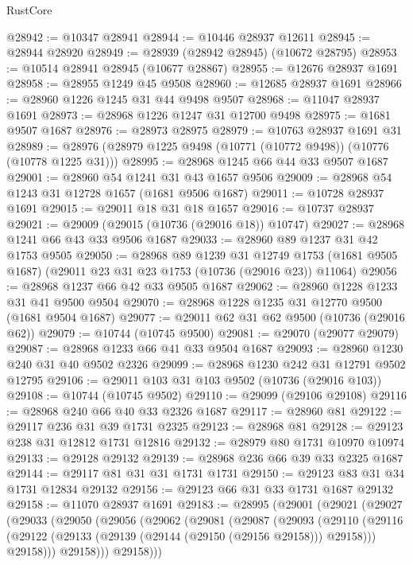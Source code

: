\begin{lexlean}{RustCore}
\begin{coremodule}
@28942 := @10347 @28941
@28944 := @10446 @28937 @12611
@28945 := @28944 @28920
@28949 := @28939 (@28942 @28945) (@10672 @28795)
@28953 := @10514 @28941 @28945 (@10677 @28867)
@28955 := @12676 @28937 @1691
@28958 := @28955 @1249 @45 @9508
@28960 := @12685 @28937 @1691
@28966 := @28960 @1226 @1245 @31 @44 @9498 @9507
@28968 := @11047 @28937 @1691
@28973 := @28968 @1226 @1247 @31 @12700 @9498
@28975 := @1681 @9507 @1687
@28976 := @28973 @28975
@28979 := @10763 @28937 @1691 @31
@28989 := @28976 (@28979 @1225 @9498 (@10771 (@10772 @9498)) (@10776 (@10778 @1225 @31)))
@28995 := @28968 @1245 @66 @44 @33 @9507 @1687
@29001 := @28960 @54 @1241 @31 @43 @1657 @9506
@29009 := @28968 @54 @1243 @31 @12728 @1657 (@1681 @9506 @1687)
@29011 := @10728 @28937 @1691
@29015 := @29011 @18 @31 @18 @1657
@29016 := @10737 @28937
@29021 := @29009 (@29015 (@10736 (@29016 @18)) @10747)
@29027 := @28968 @1241 @66 @43 @33 @9506 @1687
@29033 := @28960 @89 @1237 @31 @42 @1753 @9505
@29050 := @28968
    @89
    @1239
    @31
    @12749
    @1753
    (@1681 @9505 @1687)
    (@29011 @23 @31 @23 @1753 (@10736 (@29016 @23)) @11064)
@29056 := @28968 @1237 @66 @42 @33 @9505 @1687
@29062 := @28960 @1228 @1233 @31 @41 @9500 @9504
@29070 := @28968 @1228 @1235 @31 @12770 @9500 (@1681 @9504 @1687)
@29077 := @29011 @62 @31 @62 @9500 (@10736 (@29016 @62))
@29079 := @10744 (@10745 @9500)
@29081 := @29070 (@29077 @29079)
@29087 := @28968 @1233 @66 @41 @33 @9504 @1687
@29093 := @28960 @1230 @240 @31 @40 @9502 @2326
@29099 := @28968 @1230 @242 @31 @12791 @9502 @12795
@29106 := @29011 @103 @31 @103 @9502 (@10736 (@29016 @103))
@29108 := @10744 (@10745 @9502)
@29110 := @29099 (@29106 @29108)
@29116 := @28968 @240 @66 @40 @33 @2326 @1687
@29117 := @28960 @81
@29122 := @29117 @236 @31 @39 @1731 @2325
@29123 := @28968 @81
@29128 := @29123 @238 @31 @12812 @1731 @12816
@29132 := @28979 @80 @1731 @10970 @10974
@29133 := @29128 @29132
@29139 := @28968 @236 @66 @39 @33 @2325 @1687
@29144 := @29117 @81 @31 @31 @1731 @1731
@29150 := @29123 @83 @31 @34 @1731 @12834 @29132
@29156 := @29123 @66 @31 @33 @1731 @1687 @29132
@29158 := @11070 @28937 @1691
@29183 := @28995
    (@29001
      (@29021
        (@29027
          (@29033
            (@29050
              (@29056
                (@29062
                  (@29081
                    (@29087
                      (@29093
                        (@29110
                          (@29116
                            (@29122 (@29133 (@29139 (@29144 (@29150 (@29156 @29158))) @29158)))
                            @29158)))
                      @29158)))
                @29158)))

\end{coremodule}
\end{lexlean}
